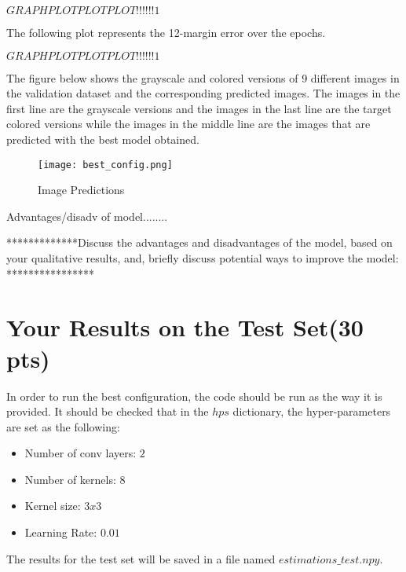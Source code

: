 \documentclass[12pt]{article}
\begin{document}
$ GRAPH PLOT PLOT PLOT!!!!!!1$


The following plot represents the 12-margin error over the epochs.

$ GRAPH PLOT PLOT PLOT!!!!!!1$


The figure below shows the grayscale and colored versions of 9 different images in the validation dataset and the corresponding predicted images. The images in the first line are the grayscale versions and the images in the last line are the target colored versions while the images in the middle line are the images that are predicted with the best model obtained.

\begin{figure}[htbp]
\centerline{\texttt{[image: best\_config.png]}}
\caption{Image Predictions}
\label{fig}
\end{figure}

Advantages/disadv of model........

*************Discuss the advantages and disadvantages of the model, based on your qualitative results, and, briefly discuss potential ways to improve the model:
    ****************
\section{Your Results on the Test Set(30 pts)}
In order to run the best configuration, the code should be run as the way it is provided. It should be checked that in the $hps$ dictionary, the hyper-parameters are set as the following:

\begin{itemize}
	\item Number of conv layers: $2$
	\item Number of kernels: $8$
	\item Kernel size: $3x3$
	\item Learning Rate: $0.01$
\end{itemize}

The results for the test set will be saved in a file named $estimations\_test.npy$.
\end{document}

